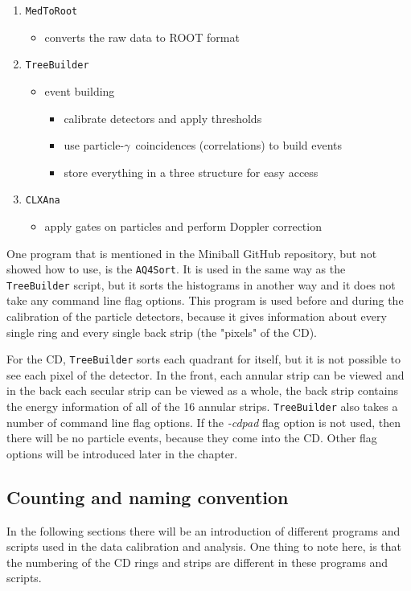 \documentclass[twoside,english]{uiofysmaster/uiofysmaster}
\newcommand{\ga}{$\gamma$}
\begin{document}
\begin{enumerate}
	\item \texttt{MedToRoot}
	\begin{itemize}
		\item converts the raw data to ROOT format
	\end{itemize}
	\item \texttt{TreeBuilder}
	\begin{itemize}
		\item event building
		\begin{itemize}
			\item calibrate detectors and apply thresholds
			\item use particle-\ga\ coincidences (correlations) to build events
			\item store everything in a three structure for easy access
		\end{itemize}
	\end{itemize}
	\item \texttt{CLXAna}
	\begin{itemize}
		\item apply gates on particles and perform Doppler correction
	\end{itemize}
\end{enumerate}

One program that is mentioned in the Miniball GitHub repository, but not showed how to use, is the \texttt{AQ4Sort}. It is used in the same way as the \texttt{TreeBuilder} script, but it sorts the histograms in another way and it does not take any command line flag options. 
This program is used before and during the calibration of the particle detectors, because it gives information about every single ring and every single back strip (the "pixels" of the CD). 

For the CD, \texttt{TreeBuilder} sorts each quadrant for itself, but it is not possible to see each pixel of the detector. 
In the front, each annular strip can be viewed and in the back each secular strip can be viewed as a whole, the back strip contains the energy information of all of the 16 annular strips. \texttt{TreeBuilder} also takes a number of command line flag options. If the \textit{-cdpad} flag option is not used, then there will be no particle events, because they come into the CD. Other flag options will be introduced later in the chapter.


\subsection{Counting and naming convention}
In the following sections there will be an introduction of different programs and scripts used in the data calibration and analysis. One thing to note here, is that the numbering of the CD rings and strips are different in these programs and scripts. 
\end{document}

